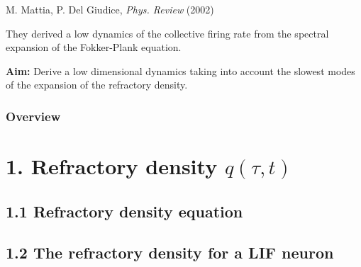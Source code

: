 \documentclass{beamer}
\begin{document}
\begin{frame}
\pause
\vspace{1.2cm}
M. Mattia, P. Del Giudice,  \textit{Phys. Review} (2002)

They derived a low dynamics of the collective firing rate from the spectral expansion of the Fokker-Plank equation.

\vspace{0.8cm}
\pause
\begin{mybox}
	\textbf{Aim: } Derive a low dimensional dynamics taking into account the slowest modes of the expansion of the refractory density.

\end{mybox}

\end{frame}



\begin{frame}
\frametitle{Overview}%
\tableofcontents %
\end{frame}







\section{1. Refractory density $q(\tau,t)$}
\subsection{1.1 Refractory density equation}
\subsection{1.2 The refractory density for a LIF neuron }
\end{document}
